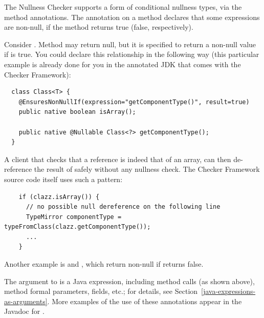 
The Nullness Checker supports a form of conditional nullness types, via the
 method annotations.
The annotation on a method declares that some expressions are non-null, if
the method returns true (false, respectively).

Consider .
Method
may return null, but it is specified to return a non-null value if
 is
true.
You could declare this relationship in the following way (this particular
example is already
done for you in the annotated JDK that comes with the Checker Framework):

\begin{Verbatim}
  class Class<T> {
    @EnsuresNonNullIf(expression="getComponentType()", result=true)
    public native boolean isArray();

    public native @Nullable Class<?> getComponentType();
  }
\end{Verbatim}

A client that checks that a  reference is indeed that of an array,
can then de-reference the result of  safely
without any nullness check.  The Checker Framework source code itself
uses such a pattern:

\begin{Verbatim}
    if (clazz.isArray()) {
      // no possible null dereference on the following line
      TypeMirror componentType = typeFromClass(clazz.getComponentType());
      ...
    }
\end{Verbatim}

Another example is 
and , which return
non-null if 
returns false.

The argument to  is a Java expression, including method calls
(as shown above), method formal parameters, fields, etc.; for details, see
Section~\ref{java-expressions-as-arguments}.
More examples of the use of these annotations appear in the Javadoc for
.

